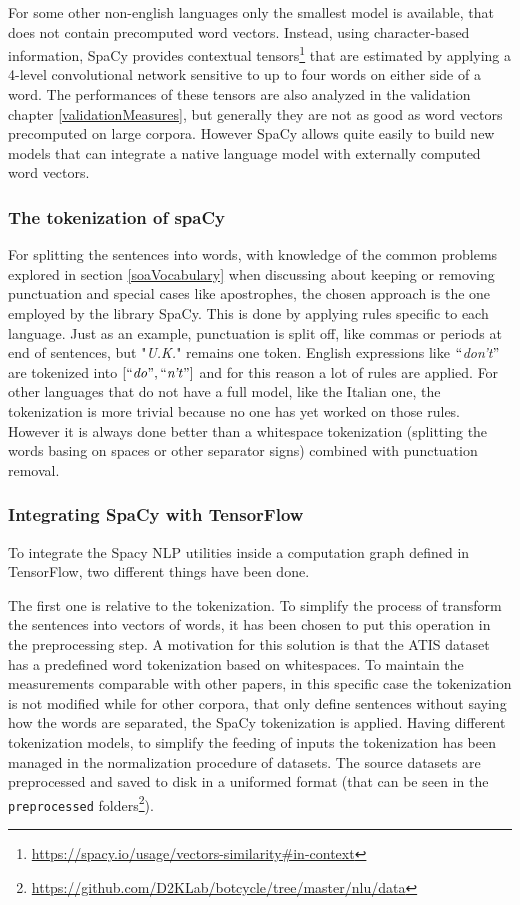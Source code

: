 For some other non-english languages only the smallest model is available, that does not contain precomputed word vectors. Instead, using character-based information, SpaCy provides contextual tensors\footnote{\url{https://spacy.io/usage/vectors-similarity\#in-context}} that are estimated by applying a 4-level convolutional network sensitive to up to four words on either side of a word. The performances of these tensors are also analyzed in the validation chapter \ref{validationMeasures}, but generally they are not as good as word vectors precomputed on large corpora. However SpaCy allows quite easily to build new models that can integrate a native language model with externally computed word vectors.

\subsubsection{The tokenization of spaCy}
For splitting the sentences into words, with knowledge of the common problems explored in section \ref{soaVocabulary} when discussing about keeping or removing punctuation and special cases like apostrophes, the chosen approach is the one employed by the library SpaCy. This is done by applying rules specific to each language. Just as an example, punctuation is split off, like commas or periods at end of sentences, but "\textit{U.K.}" remains one token. English expressions like $``$\textit{don't}$"$  are tokenized into $\left[\text{``\textit{do}''}, \text{``\textit{n't}''}\right]$ and for this reason a lot of rules are applied. For other languages that do not have a full model, like the Italian one, the tokenization is more trivial because no one has yet worked on those rules. However it is always done better than a whitespace tokenization (splitting the words basing on spaces or other separator signs) combined with punctuation removal.

\subsubsection{Integrating SpaCy with TensorFlow}
\label{implementationSpacyPyFunc}

To integrate the Spacy NLP utilities inside a computation graph defined in TensorFlow, two different things have been done.

The first one is relative to the tokenization. To simplify the process of transform the sentences into vectors of words, it has been chosen to put this operation in the preprocessing step. A motivation for this solution is that the ATIS dataset~\cite{hemphill1990atis} has a predefined word tokenization based on whitespaces. To maintain the measurements comparable with other papers, in this specific case the tokenization is not modified while for other corpora, that only define sentences without saying how the words are separated, the SpaCy tokenization is applied. Having different tokenization models, to simplify the feeding of inputs the tokenization has been managed in the normalization procedure of datasets. The source datasets are preprocessed and saved to disk in a uniformed format (that can be seen in the \texttt{preprocessed} folders\footnote{\url{https://github.com/D2KLab/botcycle/tree/master/nlu/data}}).

